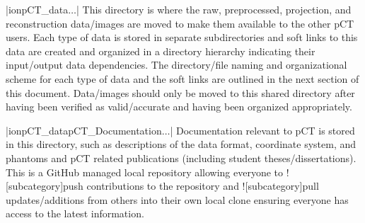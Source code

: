 \begin{tcbenvironment}
\begin{tcbparbox}
\end{tcbparbox}
\begin{tcbparbox}|\dirsep ion\dirsep pCT\_data\dirsep$\dots$|
\bfdash This directory is where the raw, preprocessed, projection, and reconstruction data/images are moved to make them available to the other pCT users.  Each type of data is stored in separate subdirectories and soft links to this data are created and organized in a directory hierarchy indicating their input/output data dependencies.  The directory/file naming and organizational scheme for each type of data and the soft links are outlined in the next section of this document.  Data/images should only be moved to this shared directory after having been verified as valid/accurate and having been organized appropriately.
\end{tcbparbox}
\begin{tcbparbox}|\dirsep ion\dirsep pCT\_data\dirsep pCT\_Documentation\dirsep $\dots$|
\bfdash Documentation relevant to pCT is stored in this directory, such as descriptions of the data format, coordinate system, and phantoms and pCT related publications (including student theses/dissertations).  This is a GitHub managed local repository allowing everyone to \docentry![subcategory]{push} contributions to the repository and \docentry![subcategory]{pull} updates/additions from others into their own local clone ensuring everyone has access to the latest information.
\end{tcbparbox}

\end{tcbenvironment}
